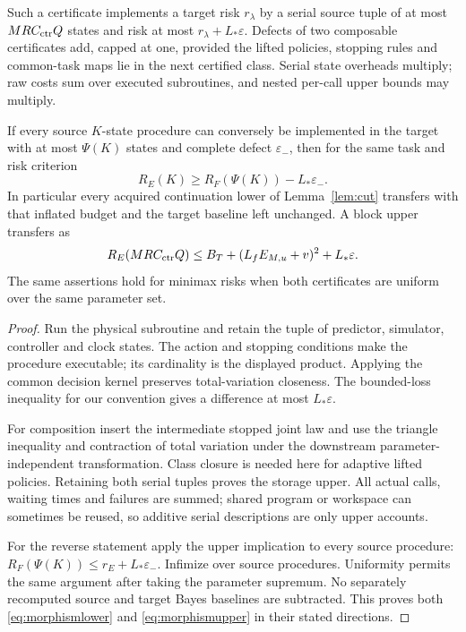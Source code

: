 \begin{theorem}\label{thm:morphism}
Such a certificate implements a target risk $r_\lambda$ by a serial source tuple of at most $MR C_{\rm ctr}Q$ states and risk at most $r_\lambda+L_*\varepsilon$. Defects of two composable certificates add, capped at one, provided the lifted policies, stopping rules and common-task maps lie in the next certified class. Serial state overheads multiply; raw costs sum over executed subroutines, and nested per-call upper bounds may multiply.

If every source $K$-state procedure can conversely be implemented in the target with at most $\Psi(K)$ states and complete defect $\varepsilon_-$, then for the same task and risk criterion
\begin{equation}\label{eq:morphismlower}
 R_E(K)\ge R_F(\Psi(K))-L_*\varepsilon_-.
\end{equation}
In particular every acquired continuation lower of Lemma~\ref{lem:cut} transfers with that inflated budget and the target baseline left unchanged. A block upper transfers as
\begin{equation}\label{eq:morphismupper}
 R_E(MRC_{\rm ctr}Q)
 \le B_T+(L_fE_{M,u}+v)^2+L_*\varepsilon.
\end{equation}
The same assertions hold for minimax risks when both certificates are uniform over the same parameter set.
\end{theorem}
\begin{proof}
Run the physical subroutine and retain the tuple of predictor, simulator, controller and clock states. The action and stopping conditions make the procedure executable; its cardinality is the displayed product. Applying the common decision kernel preserves total-variation closeness. The bounded-loss inequality for our convention gives a difference at most $L_*\varepsilon$.

For composition insert the intermediate stopped joint law and use the triangle inequality and contraction of total variation under the downstream parameter-independent transformation. Class closure is needed here for adaptive lifted policies. Retaining both serial tuples proves the storage upper. All actual calls, waiting times and failures are summed; shared program or workspace can sometimes be reused, so additive serial descriptions are only upper accounts.

For the reverse statement apply the upper implication to every source procedure: $R_F(\Psi(K))\le r_E+L_*\varepsilon_-$. Infimize over source procedures. Uniformity permits the same argument after taking the parameter supremum. No separately recomputed source and target Bayes baselines are subtracted. This proves both \eqref{eq:morphismlower} and \eqref{eq:morphismupper} in their stated directions.
\end{proof}

